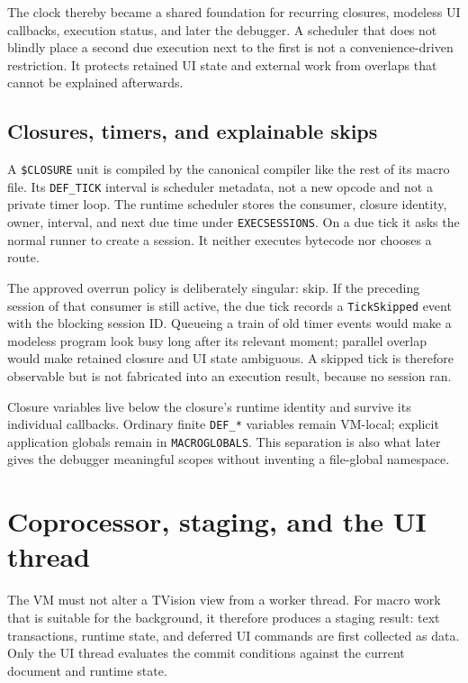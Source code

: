 \documentclass[a4paper,10pt,twoside,openany]{book}
\begin{document}
The clock thereby became a shared foundation for recurring closures, modeless
UI callbacks, execution status, and later the debugger. A scheduler that does
not blindly place a second due execution next to the first is not a
convenience-driven restriction. It protects retained UI state and external
work from overlaps that cannot be explained afterwards.

\section{Closures, timers, and explainable skips}

A \texttt{\$CLOSURE} unit is compiled by the canonical compiler like the rest
of its macro file. Its \texttt{DEF\_TICK} interval is scheduler metadata, not a
new opcode and not a private timer loop. The runtime scheduler stores the
consumer, closure identity, owner, interval, and next due time under
\texttt{EXECSESSIONS}. On a due tick it asks the normal runner to create a
session. It neither executes bytecode nor chooses a route.

The approved overrun policy is deliberately singular: skip. If the preceding
session of that consumer is still active, the due tick records a
\texttt{TickSkipped} event with the blocking session ID. Queueing a train of
old timer events would make a modeless program look busy long after its
relevant moment; parallel overlap would make retained closure and UI state
ambiguous. A skipped tick is therefore observable but is not fabricated into
an execution result, because no session ran.

Closure variables live below the closure's runtime identity and survive its
individual callbacks. Ordinary finite \texttt{DEF\_*} variables remain
VM-local; explicit application globals remain in \texttt{MACROGLOBALS}.
This separation is also what later gives the debugger meaningful scopes
without inventing a file-global namespace.

\chapter{Coprocessor, staging, and the UI thread}
\label{ch:macro-staging}

The VM must not alter a TVision view from a worker thread. For macro work that
is suitable for the background, it therefore produces a staging result: text
transactions, runtime state, and deferred UI commands are first collected as
data. Only the UI thread evaluates the commit conditions against the current
document and runtime state.
\end{document}
